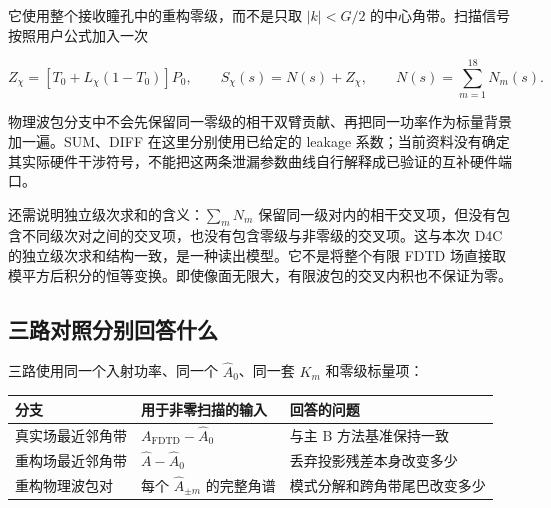 \documentclass[
  chinese,
  UTF8,
  a4paper,
  11pt]{ctexart}
\newcounter{none} %
\begin{document}
它使用整个接收瞳孔中的重构零级，而不是只取 \(|k|<G/2\)
的中心角带。扫描信号按照用户公式加入一次

\[
Z_\chi=[T_0+L_\chi(1-T_0)]P_0,
\qquad
S_\chi(s)=N(s)+Z_\chi,
\qquad
N(s)=\sum_{m=1}^{18}N_m(s).
\]

物理波包分支中不会先保留同一零级的相干双臂贡献、再把同一功率作为标量背景加一遍。SUM、DIFF
在这里分别使用已给定的 leakage
系数；当前资料没有确定其实际硬件干涉符号，不能把这两条泄漏参数曲线自行解释成已验证的互补硬件端口。

还需说明独立级次求和的含义：\(\sum_mN_m\)
保留同一级对内的相干交叉项，但没有包含不同级次对之间的交叉项，也没有包含零级与非零级的交叉项。这与本次
D4C 的独立级次求和结构一致，是一种读出模型。它不是将整个有限 FDTD
场直接取模平方后积分的恒等变换。即使像面无限大，有限波包的交叉内积也不保证为零。

\subsection{三路对照分别回答什么}\label{ux4e09ux8defux5bf9ux7167ux5206ux522bux56deux7b54ux4ec0ux4e48}

三路使用同一个入射功率、同一个 \(\widehat A_0\)、同一套 \(K_m\)
和零级标量项：

{\def\LTcaptype{none} %
\begin{longtable}[]{@{}
  >{\raggedright\arraybackslash}p{}
  >{\raggedright\arraybackslash}p{}
  >{\raggedright\arraybackslash}p{}@{}}
\toprule\noalign{}
\begin{minipage}[b]{\linewidth}\raggedright
分支
\end{minipage} & \begin{minipage}[b]{\linewidth}\raggedright
用于非零扫描的输入
\end{minipage} & \begin{minipage}[b]{\linewidth}\raggedright
回答的问题
\end{minipage} \\
\midrule\noalign{}
\endhead
\bottomrule\noalign{}
\endlastfoot
真实场最近邻角带 & \(A_{\mathrm{FDTD}}-\widehat A_0\) & 与主 B
方法基准保持一致 \\
重构场最近邻角带 & \(\widehat A-\widehat A_0\) &
丢弃投影残差本身改变多少 \\
重构物理波包对 & 每个 \(\widehat A_{\pm m}\) 的完整角谱 &
模式分解和跨角带尾巴改变多少 \\
\end{longtable}
}
\end{document}
